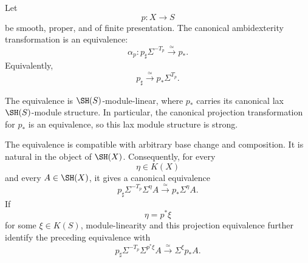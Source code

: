 \begin{theorem}
\label{thm:smooth-proper-ambidexterity}
Let
\[
    p:X\longrightarrow S
\]
be smooth, proper, and of finite presentation.  The canonical ambidexterity
transformation is an equivalence:
\[
    \alpha_p:
    p_\sharp\Sigma^{-T_p}
    \xrightarrow{\simeq}
    p_*.
\]
Equivalently,
\[
    p_\sharp
    \xrightarrow{\simeq}
    p_*\Sigma^{T_p}.
\]

The equivalence is \(\SH(S)\)-module-linear, where \(p_*\) carries its
canonical lax \(\SH(S)\)-module structure.  In particular, the canonical
projection transformation for \(p_*\) is an equivalence, so this lax module
structure is strong.

The equivalence is compatible with arbitrary base change and composition.
It is natural in the object of \(\SH(X)\).  Consequently, for every
\[
    \eta\in K(X)
\]
and every \(A\in\SH(X)\), it gives a canonical equivalence
\[
    p_\sharp
    \Sigma^{-T_p}
    \Sigma^\eta A
    \xrightarrow{\simeq}
    p_*\Sigma^\eta A.
\]
If
\[
    \eta=p^*\xi
\]
for some \(\xi\in K(S)\), module-linearity and this projection equivalence
further identify the preceding equivalence with
\[
    p_\sharp
    \Sigma^{-T_p}
    \Sigma^{p^*\xi}A
    \xrightarrow{\simeq}
    \Sigma^\xi p_*A.
\]
\end{theorem}

